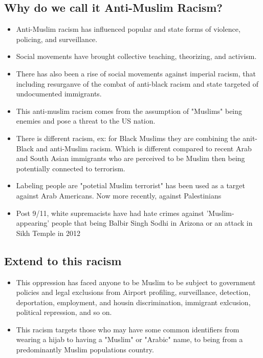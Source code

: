 \documentclass{article}
\begin{document}
  \subsection{Why do we call it Anti-Muslim Racism?}
  \begin{itemize}
    \item Anti-Muslim racism has influenced popular and state forms of
      violence, policing, and surveillance.
    \item Social movements have brought collective teaching,
      theorizing, and activism.
    \item There has also been a rise of social movements against imperial racism,
      that including resurganve of the combat of anti-black racism
      and state targeted of undocumented immigrants.
    \item This anti-muslim racism comes from the assumption of 
      "Muslims" being enemies and pose a threat to the US nation.
    \item There is different racism, ex: for Black Muslims they are combining
      the anit-Black and anti-Muslim racism. Which is different compared to
      recent Arab and South Asian immigrants who are perceived to be Muslim
      then being potentially connected to terrorism.
    \item Labeling people are "potetial Muslim terrorist" has been used
      as a target against Arab Americans. Now more recently, against Palestinians
    \item Post 9/11, white supremacists have had hate crimes against 'Muslim-appearing' people
      that being Balbir Singh Sodhi in Arizona or an attack in Sikh Temple in 2012
  \end{itemize}

  \subsection{Extend to this racism}
  \begin{itemize}
    \item This oppression has faced anyone to be Muslim to be subject
      to government policies and legal exclusions from Airport profiling,
      surveillance, detection, deportation, employment, and housin discrimination, immigrant exlcusion,
      political repression, and so on.
    \item This racism targets those who may have some common identifiers from wearing a hijab
      to having a "Muslim" or "Arabic" name, to being from a predominantly
      Muslim populations country.
  \end{itemize}
\end{document}
